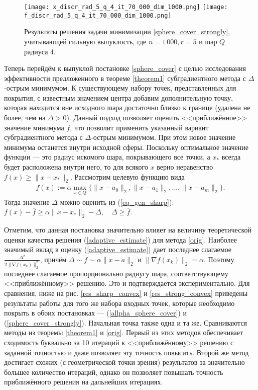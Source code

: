     \begin{figure}[h]
        \texttt{[image: x\_discr\_rad\_5\_q\_4\_it\_70\_000\_dim\_1000.png]}
        \endminipage\hfill
        \texttt{[image: f\_discr\_rad\_5\_q\_4\_it\_70\_000\_dim\_1000.png]}
        \endminipage\hfill
        \caption{Результаты решения задачи минимизации \eqref{sphere_cover_strongly}, учитывающей сильную выпуклость, где  $n= 1\,000, r = 5$ и  шар $Q$ радиуса 4.}
        \label{res_ex_strong_r5}
    \end{figure}

    Теперь перейдём к выпуклой постановке \eqref{sphere_cover} с целью исследования эффективности предложенного в теореме \ref{theorem1} субградиентного метода с $\Delta$-острым минимумом. К существующему набору точек, представленных для покрытия, с известным значением центра добавим дополнительную точку, которая находится вне исходного шара достаточно близко к границе (удалена не более, чем на $\Delta > 0$). Данный подход позволяет оценить <<приближённое>> значение минимума $\overline{f}$, что позволит применить указанный вариант субградиентного метода с $\Delta$-острым минимумом. При этом новое значение минимума останется внутри исходной сферы. Поскольку оптимальное значение функции --- это радиус искомого шара, покрывающего все точки, а $x_*$ всегда будет расположена внутри него, то для всякого $x$ верно неравенство $ f(x) \geq \| x - x_*\|_2$. Рассмотрим целевую функцию вида
    \begin{gather}\label{allpha_sphere_cover}
        f(x) := \alpha \max_{x\in Q}\{\|x - a_0\|_2, \|x - a_1\|_2, ..., \|x - a_m\|_2\}.
    \end{gather}
    Тогда значение $\Delta$ можно оценить  из (\ref{eq_gen_sharp}): 
        $f(x) - \overline{f} \geq \alpha\|x- x_*\|_2 - \Delta, \quad \Delta \geq \overline{f}$.

    Отметим, что данная постановка значительно влияет на величину теоретической оценки качества решения (\ref{adaptive_estimate}) для метода \eqref{orig}.
    Наиболее значимый вклад в оценку (\ref{adaptive_estimate}) дает последнее слагаемое $\frac{\Delta^2}{2\|\nabla f(x_k)\|^2_2}$, причём 
    $     \Delta \sim \overline{f} \sim \alpha \|\overline{x}-a\|_2 $ и 
    $     \|\nabla f(x_k)\|_2 = \alpha $. Поэтому последнее слагаемое пропорционально радиусу шара, соответствующему <<приближённому>> решению. Это и подтверждается экспериментально. Для сравнения, ниже на рис. \ref{res_sharp_convex} и \ref{res_strong_convex} приведены результаты работы для того же набора входных точек, которые необходимо покрыть в обоих постановках --- (\ref{allpha_sphere_cover}) и (\ref{sphere_cover_strongly}). Начальная точка также одна и та же. Сравниваются методы из теоремы \ref{theorem1} и \eqref{orig}. Первый из этих методов обеспечивает сходимость буквально за 10 итераций к <<приближённому>> решению с заданной точностью и даже позволяет эту точность повысить. Второй же метод достигает схожих (с геометрической точки зрения) результатов за значительно большее количество итераций, однако он позволяет повышать точность приближённого решения на дальнейших итерациях.

